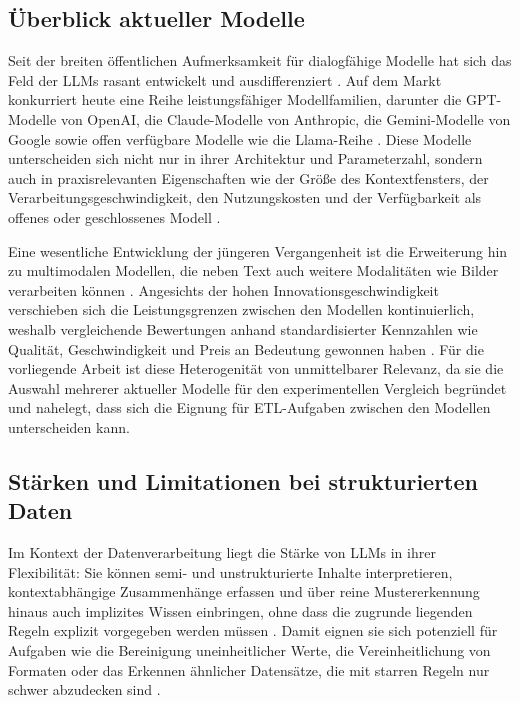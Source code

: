 \subsection{Überblick aktueller Modelle}
\label{subsec:llm-modelle}

Seit der breiten öffentlichen Aufmerksamkeit für dialogfähige Modelle hat sich das Feld der \acp{LLM} rasant entwickelt und ausdifferenziert \autocite{zhaoSurveyLargeLanguage2026,2026AIIndex}. Auf dem Markt konkurriert heute eine Reihe leistungsfähiger Modellfamilien, darunter die GPT-Modelle von OpenAI, die Claude-Modelle von Anthropic, die Gemini-Modelle von Google sowie offen verfügbare Modelle wie die Llama-Reihe \autocite{zhaoSurveyLargeLanguage2026,2026AIIndex}. Diese Modelle unterscheiden sich nicht nur in ihrer Architektur und Parameterzahl, sondern auch in praxisrelevanten Eigenschaften wie der Größe des Kontextfensters, der Verarbeitungsgeschwindigkeit, den Nutzungskosten und der Verfügbarkeit als offenes oder geschlossenes Modell \autocite{zhaoSurveyLargeLanguage2026,2026AIIndex}.

Eine wesentliche Entwicklung der jüngeren Vergangenheit ist die Erweiterung hin zu multimodalen Modellen, die neben Text auch weitere Modalitäten wie Bilder verarbeiten können \autocite{liangSurveyMultimodelLarge2024,zhaoSurveyLargeLanguage2026}. Angesichts der hohen Innovationsgeschwindigkeit verschieben sich die Leistungsgrenzen zwischen den Modellen kontinuierlich, weshalb vergleichende Bewertungen anhand standardisierter Kennzahlen wie Qualität, Geschwindigkeit und Preis an Bedeutung gewonnen haben \autocite{ComparisonAIModels,2026AIIndex}. Für die vorliegende Arbeit ist diese Heterogenität von unmittelbarer Relevanz, da sie die Auswahl mehrerer aktueller Modelle für den experimentellen Vergleich begründet und nahelegt, dass sich die Eignung für \ac{ETL}-Aufgaben zwischen den Modellen unterscheiden kann.

\subsection{Stärken und Limitationen bei strukturierten Daten}
\label{subsec:llm-strukturierte-daten}

Im Kontext der Datenverarbeitung liegt die Stärke von \acp{LLM} in ihrer Flexibilität: Sie können semi- und unstrukturierte Inhalte interpretieren, kontextabhängige Zusammenhänge erfassen und über reine Mustererkennung hinaus auch implizites Wissen einbringen, ohne dass die zugrunde liegenden Regeln explizit vorgegeben werden müssen \autocite{hassaniRoleChatGPTData2023,zhaoSurveyLargeLanguage2026}. Damit eignen sie sich potenziell für Aufgaben wie die Bereinigung uneinheitlicher Werte, die Vereinheitlichung von Formaten oder das Erkennen ähnlicher Datensätze, die mit starren Regeln nur schwer abzudecken sind \autocite{hassaniRoleChatGPTData2023}.

